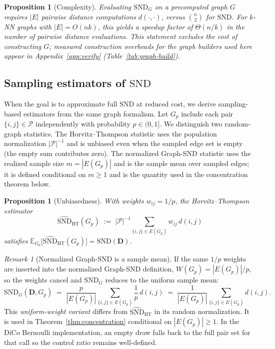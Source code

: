 \documentclass{article}
\theoremstyle{plain}
\newtheorem{proposition}[theorem]{Proposition}
\theoremstyle{definition}
\theoremstyle{remark}
\newtheorem{remark}[theorem]{Remark}
\newcommand{\E}{\mathbb{E}}
\newcommand{\Pairs}{\mathcal{P}}         %
\newcommand{\SND}{\ensuremath{\mathrm{SND}}}
\newcommand{\SNDG}{\mathrm{SND}_{G}}
\begin{document}
\begin{proposition}[Complexity]
\label{prop:complexity}
Evaluating $\SNDG$ on a precomputed graph $G$ requires $|E|$ pairwise
distance computations $d(\cdot,\cdot)$, versus $\binom{n}{2}$ for $\SND$.
For $k$-NN graphs with $|E| = O(nk)$, this yields a speedup factor of
$\Theta(n/k)$ in the number of pairwise distance evaluations. This
statement excludes the cost of constructing $G$; measured construction
overheads for the graph builders used here appear in
Appendix~\ref{app:verify} (Table~\ref{tab:graph-build}).
\end{proposition}

\subsection{Sampling estimators of $\SND$}
\label{sec:method:estimator}

When the goal is to approximate full $\SND$ at reduced cost, we derive
sampling-based estimators from the same graph formalism. Let $G_p$ include
each pair $\{i,j\} \in \Pairs$ independently with probability
$p \in (0, 1]$. We distinguish two random-graph statistics. The
Horvitz--Thompson statistic uses the population normalization
$|\Pairs|^{-1}$ and is unbiased even when the sampled edge set is empty
(the empty sum contributes zero). The normalized Graph-SND statistic uses
the realized sample size $m=|E(G_p)|$ and is the sample mean over sampled
edges; it is defined conditional on $m\geq1$ and is the quantity used in
the concentration theorem below.

\begin{proposition}[Unbiasedness]
\label{prop:unbiased}
With weights $w_{ij}=1/p$, the Horvitz--Thompson estimator
\[
\widehat{\SND}_{\mathrm{HT}}(G_p) \;:=\; |\Pairs|^{-1}
\sum_{\{i,j\} \in E(G_p)} w_{ij}\, d(i,j)
\]
satisfies
$\E_{G_p}\bigl[\widehat{\SND}_{\mathrm{HT}}(G_p)\bigr]
= \SND(\mathbf{D})$.
\end{proposition}

\begin{remark}[Normalized Graph-SND is a sample mean]
\label{rem:ht-sample-mean}
If the same $1/p$ weights are inserted into the normalized Graph-SND
definition, $W(G_p) = |E(G_p)|/p$, so the weights cancel and $\SNDG$
reduces to the uniform sample mean:
\[
\SNDG(\mathbf{D}, G_p)
\;=\; \frac{p}{|E(G_p)|} \sum_{\{i,j\} \in E(G_p)} \frac{1}{p}\, d(i,j)
\;=\; \frac{1}{|E(G_p)|} \sum_{\{i,j\} \in E(G_p)} d(i,j).
\]
This \emph{uniform-weight variant} differs from
$\widehat{\SND}_{\mathrm{HT}}$ in its random normalization. It is used in
Theorem~\ref{thm:concentration} conditional on $|E(G_p)|\geq1$. In the
DiCo Bernoulli implementation, an empty draw falls back to the full pair
set for that call so the control ratio remains well-defined.
\end{remark}
\end{document}
